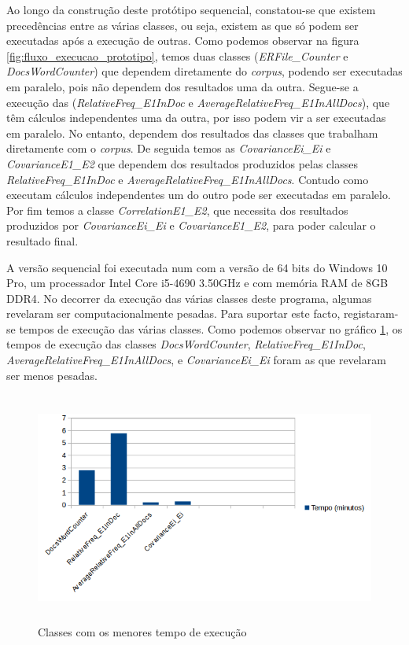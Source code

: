 Ao longo da construção deste protótipo sequencial, constatou-se que existem precedências entre as várias classes, ou seja, existem as que só podem ser executadas após a execução de outras. Como podemos observar na figura \ref{fig:fluxo_execucao_prototipo}, temos duas classes (\textit{ERFile\_Counter} e \textit{DocsWordCounter}) que dependem diretamente do \textit{corpus}, podendo ser executadas em paralelo, pois não dependem dos resultados uma da outra. Segue-se a execução das  (\textit{RelativeFreq\_E1InDoc} e \textit{AverageRelativeFreq\_E1InAllDocs}), que têm cálculos independentes uma da outra, por isso podem vir a ser executadas em paralelo. No entanto, dependem dos resultados das classes que trabalham diretamente com o \textit{corpus}. De seguida temos as \textit{CovarianceEi\_Ei} e \textit{CovarianceE1\_E2} que dependem dos resultados produzidos pelas classes \textit{RelativeFreq\_E1InDoc} e \textit{AverageRelativeFreq\_E1InAllDocs}. Contudo como executam cálculos independentes um do outro pode ser executadas em paralelo. Por fim temos a classe \textit{CorrelationE1\_E2}, que necessita dos resultados produzidos por \textit{CovarianceEi\_Ei} e \textit{CovarianceE1\_E2}, para poder calcular o resultado final. 


A versão sequencial foi executada num  com a versão de 64 bits do Windows 10 Pro, um processador Intel Core i5-4690 3.50GHz e com memória RAM de 8GB DDR4. No decorrer da execução das várias classes deste programa, algumas revelaram ser computacionalmente pesadas. Para suportar este facto, registaram-se tempos de execução das várias classes. Como podemos observar no gráfico \ref{fig:temposExecucao_Menores}, os tempos de execução das classes \textit{DocsWordCounter}, \textit{RelativeFreq\_E1InDoc}, \textit{AverageRelativeFreq\_E1InAllDocs}, e \textit{CovarianceEi\_Ei} foram as que revelaram ser menos pesadas. 

\begin{figure}[htbp]
	\centering
	\includegraphics[height=3in]{LaTeX/Chapters/Figures/temposExecucao_Menores.png}
  \caption{Classes com os menores tempo de execução}
  \label{fig:temposExecucao_Menores}
\end{figure}

